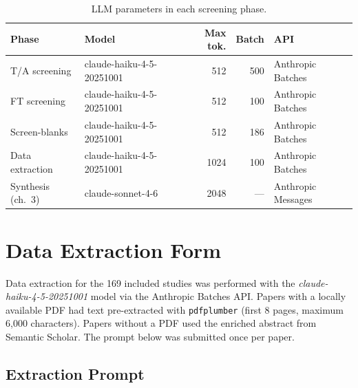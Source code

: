 \begin{table}[htbp]
\centering
\caption{LLM parameters in each screening phase.}
\label{tab:app-prompt-params}
\small
\setlength{\tabcolsep}{4pt}
\begin{tabular}{l l r r l}
\toprule
\textbf{Phase} & \textbf{Model} & \textbf{Max tok.} &
  \textbf{Batch} & \textbf{API} \\
\midrule
T/A screening          & claude-haiku-4-5-20251001 & 512  & 500 & Anthropic Batches \\
FT screening           & claude-haiku-4-5-20251001 & 512  & 100 & Anthropic Batches \\
Screen-blanks          & claude-haiku-4-5-20251001 & 512  & 186 & Anthropic Batches \\
Data extraction        & claude-haiku-4-5-20251001 & 1024 & 100 & Anthropic Batches \\
Synthesis (ch.~3)       & claude-sonnet-4-6         & 2048 & --- & Anthropic Messages \\
\bottomrule
\end{tabular}
\end{table}


\chapter{Data Extraction Form}
\label{app:G}

Data extraction for the 169 included studies was performed with the
\textit{claude-haiku-4-5-20251001} model via the Anthropic Batches API.
Papers with a locally available PDF had text pre-extracted with
\texttt{pdfplumber} (first 8 pages, maximum 6{,}000 characters). Papers
without a PDF used the enriched abstract from Semantic Scholar. The prompt
below was submitted once per paper.

\section{Extraction Prompt}
\label{app:slr-extraction-prompt}

